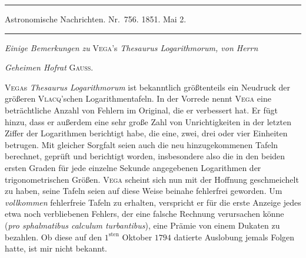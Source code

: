 \par{}
\begin{center}
\rule{0.7\linewidth}{0.4pt}\par
Astronomische Nachrichten. Nr.\ 756. 1851. Mai 2.\par
\rule{0.7\linewidth}{0.4pt}
\end{center}
\begin{center}\emph{Einige Bemerkungen zu} \textsc{Vega}'s \emph{Thesaurus Logarithmorum, von Herrn}\par
\emph{Geheimen Hofrat} \textsc{Gauss}.\end{center}

\textsc{Vega}s \emph{Thesaurus Logarithmorum} ist bekanntlich größtenteils ein Neudruck der größeren \textsc{Vlacq}'schen Logarithmentafeln. In der Vorrede nennt \textsc{Vega} eine beträchtliche Anzahl von Fehlern im Original, die er verbessert hat. Er fügt hinzu, dass er außerdem eine sehr große Zahl von Unrichtigkeiten in der letzten Ziffer der Logarithmen berichtigt habe, die eine, zwei, drei oder vier Einheiten betrugen. Mit gleicher Sorgfalt seien auch die neu hinzugekommenen Tafeln berechnet, geprüft und berichtigt worden, insbesondere also die in  den beiden ersten Graden für jede einzelne Sekunde angegebenen Logarithmen der trigonometrischen Größen. \textsc{Vega} scheint sich nun mit der Hoffnung geschmeichelt zu haben, seine Tafeln seien auf diese Weise beinahe fehlerfrei geworden. Um \emph{vollkommen} fehlerfreie Tafeln zu erhalten, verspricht er für die erste Anzeige jedes etwa noch verbliebenen Fehlers, der eine falsche Rechnung verursachen könne (\emph{pro sphalmatibus calculum turbantibus}), eine Prämie von einem Dukaten zu bezahlen. Ob diese auf den $1^{\mathrm{sten}}$ Oktober $1794$ datierte Auslobung jemals Folgen hatte, ist mir nicht bekannt.

